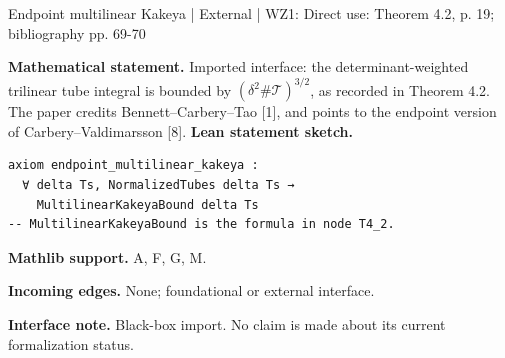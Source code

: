 \documentclass[10pt,a4paper]{article}
\begin{document}
\begin{minipage}{\linewidth}
\hypertarget{node-XBCT}{}
\begin{tcolorbox}[colback=white,colframe=externalfg,colbacktitle=externalbg,coltitle=ink,boxrule=0.45pt,arc=1.6mm,left=3mm,right=3mm,top=2mm,bottom=2mm,title={\sffamily\bfseries External [1] / [8] \hfill \texttt{XBCT}}]
{\sffamily\small\color{muted}Endpoint multilinear Kakeya | External | WZ1: Direct use: Theorem 4.2, p. 19; bibliography pp. 69-70}\par
\textbf{Mathematical statement.} Imported interface: the determinant-weighted trilinear tube integral is bounded by $(\delta^2\#\mathcal T)^{3/2}$, as recorded in Theorem 4.2.
The paper credits Bennett--Carbery--Tao [1], and points to the endpoint version of Carbery--Valdimarsson [8].
\smallskip\textbf{Lean statement sketch.}
\begin{Verbatim}[fontsize=\small,breaklines=true,breakanywhere=true,tabsize=2]
axiom endpoint_multilinear_kakeya :
  ∀ delta Ts, NormalizedTubes delta Ts →
    MultilinearKakeyaBound delta Ts
-- MultilinearKakeyaBound is the formula in node T4_2.
\end{Verbatim}
{\footnotesize\textbf{Mathlib support.} A, F, G, M.\par
\textbf{Incoming edges.} None; foundational or external interface.\par}
{\footnotesize\textbf{Interface note.} Black-box import. No claim is made about its current formalization status.}
\end{tcolorbox}\end{minipage}\par\medskip
\end{document}

